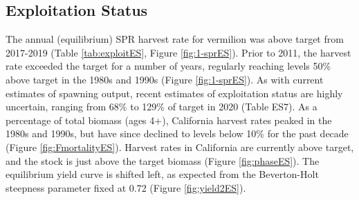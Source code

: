 \documentclass[11pt,
  english,
  a4paper,
]{article}
\begin{document}
\FloatBarrier


\hypertarget{exploitation-status}{%
\subsection*{Exploitation Status}\label{exploitation-status}}

\leavevmode\tagmcend\tagstructend

The annual (equilibrium) SPR harvest rate for vermilion was above target from 2017-2019 (Table \ref{tab:exploitES}, Figure \ref{fig:1-sprES}). Prior to 2011, the harvest rate exceeded the target for a number of years, regularly reaching levels 50\% above target in the 1980s and 1990s (Figure \ref{fig:1-sprES}). As with current estimates of spawning output, recent estimates of exploitation status are highly uncertain, ranging from 68\% to 129\% of target in 2020 (Table ES7). As a percentage of total biomass (ages 4+), California harvest rates peaked in the 1980s and 1990s, but have since declined to levels below 10\% for the past decade (Figure \ref{fig:FmortalityES}). Harvest rates in California are currently above target, and the stock is just above the target biomass (Figure \ref{fig:phaseES}). The equilibrium yield curve is shifted left, as expected from the Beverton-Holt steepness parameter fixed at 0.72 (Figure \ref{fig:yield2ES}).
\end{document}
